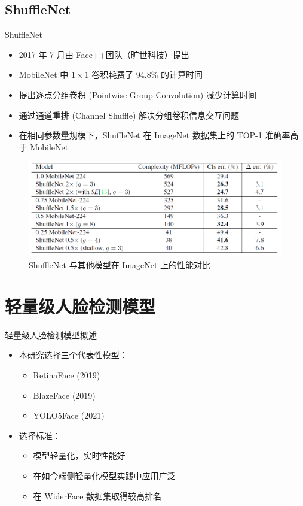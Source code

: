 \documentclass{beamer}
\begin{document}
\subsection{ShuffleNet}
\begin{frame}{ShuffleNet}

    \begin{itemize}
        \item 2017 年 7 月由 Face++团队（旷世科技）提出
        \item MobileNet 中 $1 \times 1$ 卷积耗费了 94.8\% 的计算时间
        \item 提出逐点分组卷积 (Pointwise Group Convolution) 减少计算时间
        \item 通过通道重排 (Channel Shuffle) 解决分组卷积信息交互问题
        \item 在相同参数量规模下，ShuffleNet 在 ImageNet 数据集上的 TOP-1 准确率高于 MobileNet
    \end{itemize}

    \begin{figure}
        \centering
        \includegraphics[width=0.6\linewidth]{pic/shufflenet_comp.png}
        \caption{ShuffleNet 与其他模型在 ImageNet 上的性能对比}
    \end{figure}
\end{frame}

\section{轻量级人脸检测模型}

\begin{frame}{轻量级人脸检测模型概述}
    \begin{itemize}
        \item 本研究选择三个代表性模型：
        \begin{itemize}
            \item RetinaFace (2019)
            \item BlazeFace (2019)
            \item YOLO5Face (2021)
        \end{itemize}
        \item 选择标准：
        \begin{itemize}
            \item 模型轻量化，实时性能好
            \item 在如今端侧轻量化模型实践中应用广泛
            \item 在 WiderFace 数据集取得较高排名
        \end{itemize}
    \end{itemize}
\end{frame}
\end{document}
